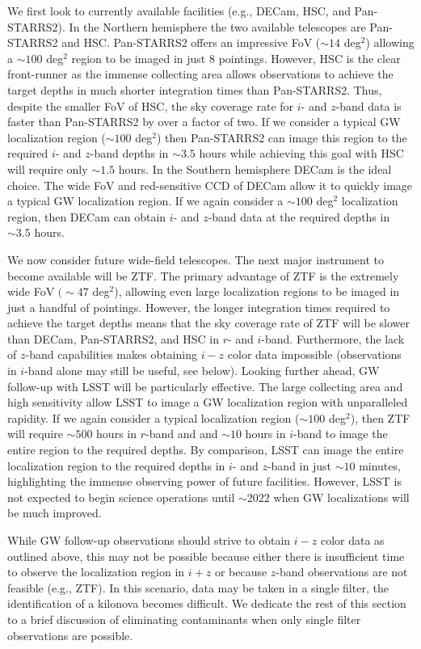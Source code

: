 We first look to currently available facilities (e.g., DECam, HSC, and Pan-STARRS2). In the Northern hemisphere the two available telescopes are Pan-STARRS2 and HSC. Pan-STARRS2 offers an impressive FoV ($\sim14$ deg$^2$) allowing a $\sim100$ deg$^2$ region to be imaged in just $8$ pointings. However, HSC is the clear front-runner as  the immense collecting area allows observations to achieve the target depths in much shorter integration times than Pan-STARRS2. Thus, despite the smaller FoV of HSC, the sky coverage rate for $i$- and $z$-band data is faster than Pan-STARRS2 by over a factor of two. If we consider a typical GW localization region ($\sim 100$ deg$^2$) then Pan-STARRS2 can image this region to the required $i$- and $z$-band depths in $\sim 3.5$ hours while achieving this goal with HSC will require only $\sim1.5$ hours. In the Southern hemisphere DECam is the ideal choice. The wide FoV and red-sensitive CCD of DECam allow it to quickly image a typical GW localization region. If we again consider a $\sim100$ deg$^2$  localization region, then DECam can obtain $i$- and $z$-band data at the required depths in $\sim3.5$ hours. 

We now consider future wide-field telescopes. The next major instrument to become available will be ZTF. The primary advantage of ZTF is the extremely wide FoV $(\sim47$ deg$^2$), allowing even large localization regions to be imaged in just a handful of pointings. However, the longer integration times required to achieve the target depths means that the sky coverage rate of ZTF will be slower than DECam, Pan-STARRS2, and HSC in $r$- and $i$-band. Furthermore, the lack of $z$-band capabilities makes obtaining $i-z$ color data impossible (observations in $i$-band alone may still be useful, see below). Looking further ahead, GW follow-up with LSST will be particularly effective. The large collecting area and high sensitivity allow LSST to image a GW localization region with unparalleled rapidity. If we again consider a typical localization region ($\sim 100$ deg$^2$), then ZTF will require $\sim500$ hours in $r$-band and and $\sim10$ hours in $i$-band to image the entire region to the required depths. By comparison, LSST can image the entire localization region to the required depths in $i$- and $z$-band in just $\sim10$ minutes, highlighting the immense observing power of future facilities. However, LSST is not expected to begin science operations until $\sim2022$ when GW localizations will be much improved.

While GW follow-up observations should strive to obtain $i-z$ color data as outlined above, this may not be possible because either there is insufficient time to observe the localization region in $i+z$ or because $z$-band observations are not feasible (e.g., ZTF). In this scenario, data may be taken in a single filter,  the identification of a kilonova becomes difficult. We dedicate the rest of this section to a brief discussion of eliminating contaminants when only single filter observations are possible. 

